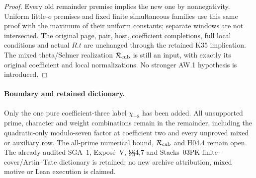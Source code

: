 \begin{proof}
Every old remainder premise implies the new one by nonnegativity.
Uniform little-$o$ premises and fixed finite simultaneous families
use this same proof with the maximum of their uniform constants;
separate windows are not intersected. The original page, pair,
host, coefficient completions, full local conditions and actual
$R.t$ are unchanged through the retained K35 implication.
The mixed theta/Selmer realization $\mathcal R_{\rm cub}$ is
still an input, with exactly its original coefficient and local
normalizations. No stronger AW.1 hypothesis is introduced.
\end{proof}

\paragraph{Boundary and retained dictionary.}
Only the one pure coefficient-three label $\chi_{-8}$ has been
added. All unsupported prime, character and weight combinations
remain in the remainder, including the quadratic-only modulo-seven
factor at coefficient two and every unproved mixed or auxiliary row.
The all-prime numerical bound, $\mathcal R_{\rm cub}$ and H04.4
remain open. The already audited SGA~1, Expos\'e~V, \S\S4,7 and
Stacks~03PK finite-cover/Artin--Tate dictionary is retained;
no new archive attribution, mixed motive or Lean execution is claimed.
